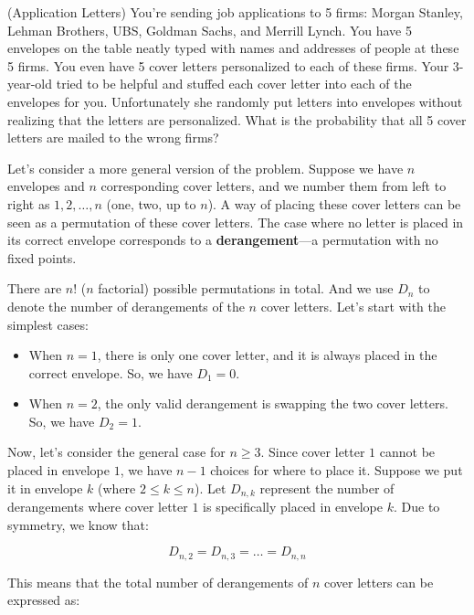 \documentclass[12pt,letterpaper, onecolumn]{exam}
\begin{document}
\begin{questions}
    \question[1 Mark] (Application Letters) You're sending job applications to 5 firms: Morgan Stanley, Lehman Brothers, UBS, Goldman Sachs, and Merrill Lynch. You have 5 envelopes on the table neatly typed with names and addresses of people at these 5 firms. You even have 5 cover letters personalized to each of these firms. Your 3-year-old tried to be helpful and stuffed each cover letter into each of the envelopes for you. Unfortunately she randomly put letters into envelopes without realizing that the letters are personalized. What is the probability that all 5 cover letters are mailed to the wrong firms?
    
    \begin{solution}
       Let's consider a more general version of the problem. Suppose we have \( n \) envelopes and \( n \) corresponding cover letters, and we number them from left to right as \( 1, 2, \dots, n \) (one, two, up to $n$). A way of placing  these cover letters can be seen as a permutation of these cover letters. The case where no letter is placed in its correct envelope corresponds to a \textbf{derangement}—a permutation with no fixed points.

    \quad There are \( n! \) ($n$ factorial) possible permutations in total. And we use \( D_n \) to denote the number of derangements of the \( n \) cover letters. Let's start with the simplest cases:

\begin{itemize}
    \item When \( n = 1 \), there is only one cover letter, and it is always placed in the correct envelope. So, we have \( D_1 = 0 \).
    \item When \( n = 2 \), the only valid derangement is swapping the two cover letters. So, we have \( D_2 = 1 \).
\end{itemize}

\quad Now, let's consider the general case for \( n \geq 3 \). Since cover letter \( 1 \) cannot be placed in envelope \( 1 \), we have \( n-1 \) choices for where to place it. Suppose we put it in envelope \( k \) (where \( 2 \leq k \leq n \)). Let \( D_{n,k} \) represent the number of derangements where cover letter \( 1 \) is specifically placed in envelope \( k \). Due to symmetry, we know that:

\[
D_{n,2} = D_{n,3} = \dots = D_{n,n}
\]

This means that the total number of derangements of $n$ cover letters can be expressed as:


\end{solution}
\end{questions}
\end{document}
